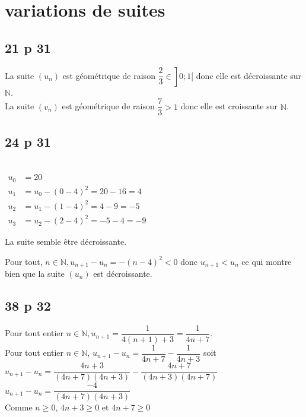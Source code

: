 \documentclass[a4paper,french]{book}
\begin{document}
\section*{variations de suites}

\subsection*{21 p 31}
La suite $\left(u_{n}\right)$ est géométrique de raison $\left.\dfrac{2}{3} \in\right] 0 ; 1[$ donc elle est décroissante sur $\mathbb{N}$.\\
La suite $\left(v_{n}\right)$ est géométrique de raison $\dfrac{7}{3}>1$ donc elle est croissante sur $\mathbb{N}$.

\subsection*{24 p 31}
\begin{enumMet}
    \item \ \\
    $
    \begin{aligned}
    u_{0} &=20 \\
    u_{1} &=u_{0}-(0-4)^{2}=20-16=4 \\
    u_{2} &=u_{1}-(1-4)^{2}=4-9=-5 \\
    u_{3} &=u_{2}-(2-4)^{2}=-5-4=-9
    \end{aligned}
    $
    \item La suite semble être décroissante.
    \item Pour tout, $n \in \mathbb{N}, u_{n+1}-u_{n}=-(n-4)^{2}<0$ donc $u_{n+1}<u_{n}$ ce qui montre bien que la suite $\left(u_{n}\right)$ est décroissante.
\end{enumMet}

\subsection*{38 p 32}
Pour tout entier $n \in \mathbb{N}, u_{n+1}=\dfrac{1}{4(n+1)+3}=\dfrac{1}{4 n+7}$.\\
Pour tout entier $n \in \mathbb{N}$, $u_{n+1}-u_{n}=\dfrac{1}{4 n+7}-\dfrac{1}{4 n+3}$ soit\\
$u_{n+1}-u_{n}=\dfrac{4 n+3}{(4 n+7)(4 n+3)}-\dfrac{4 n+7}{(4 n+3)(4 n+7)}$\\
$u_{n+1}-u_{n}=\dfrac{-4}{(4 n+7)(4 n+3)}$\\
Comme $n \geqslant 0$, $4 n+3 \geqslant 0$ et $4 n+7 \geqslant 0$
\end{document}
